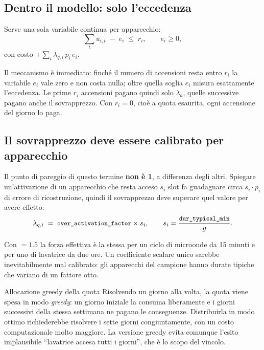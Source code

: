 \subsection*{Dentro il modello: solo l'eccedenza}

Serve una sola variabile continua per apparecchio:
\begin{equation}
  \sum_{t} u_{i,t} \;-\; e_i \;\le\; r_i ,
  \qquad e_i \ge 0 ,
  \label{eq:quota}
\end{equation}
con costo $+\sum_i \lambda_{q,i} \, p_i \, e_i$.

Il meccanismo è immediato: finché il numero di accensioni resta entro $r_i$ la variabile $e_i$ vale
zero e non costa nulla; oltre quella soglia $e_i$ misura esattamente l'eccedenza. Le prime $r_i$
accensioni pagano quindi solo $\lambda_a$, quelle successive pagano anche il sovrapprezzo. Con
$r_i = 0$, cioè a quota esaurita, ogni accensione del giorno lo paga.

\subsection*{Il sovrapprezzo deve essere calibrato per apparecchio}

Il punto di pareggio di questo termine \textbf{non è 1}, a differenza degli altri. Spiegare
un'attivazione di un apparecchio che resta acceso $s_i$ slot fa guadagnare circa $s_i \cdot p_i$ di
errore di ricostruzione, quindi il sovrapprezzo deve superare quel valore per avere effetto:
\begin{equation}
  \lambda_{q,i} \;=\; \texttt{\small over\_activation\_factor} \times s_i ,
  \qquad s_i = \frac{\texttt{\small dur\_typical\_min}}{g} .
  \label{eq:quota-calibrazione}
\end{equation}

Con  $= 1.5$ la forza effettiva è la stessa per un ciclo di
microonde da 15 minuti e per uno di lavatrice da due ore. Un coefficiente scalare unico sarebbe
inevitabilmente mal calibrato: gli apparecchi del campione hanno durate tipiche che variano di un
fattore otto.

\begin{warnbox}{Allocazione greedy della quota}
Risolvendo un giorno alla volta, la quota viene spesa in modo \emph{greedy}: un giorno iniziale la
consuma liberamente e i giorni successivi della stessa settimana ne pagano le conseguenze.
Distribuirla in modo ottimo richiederebbe risolvere i sette giorni congiuntamente, con un costo
computazionale molto maggiore. La versione greedy evita comunque l'esito implausibile
``lavatrice accesa tutti i giorni'', che è lo scopo del vincolo.
\end{warnbox}

